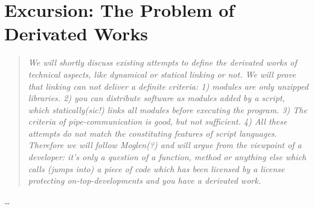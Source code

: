 %
%
%
%
%



\section{Excursion: The Problem of Derivated Works}
\footnotesize
\begin{quote}\itshape
We will shortly discuss existing attempts to define the derivated works of
technical aspects, like dynamical or statical linking or not. We will
prove that linking can not deliver a definite criteria: 1) modules are only
unzipped libraries. 2) you can distribute software as modules added by a script,
which statically(sic!) links all modules before executing the program. 3) The
criteria of pipe-communication is good, but not sufficient. 4) All these
attempts do not match the constituting features of script languages. Therefore we
will follow Moglen(?) and will argue from the viewpoint of a developer: it's
only a question of a function, method or anything else which calls (jumps into)
a piece of code which has been licensed by a license protecting
on-top-developments and you have a derivated work.
\end{quote}
\normalsize
\ldots


%
